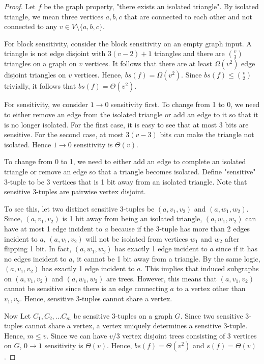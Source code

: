 \documentclass[psamsfonts]{amsart}
\theoremstyle{definition}
\theoremstyle{remark}
\numberwithin{equation}{section}
\begin{document}
\begin{proof}
Let $f$ be the graph property, "there exists an isolated triangle". By isolated triangle, we mean three vertices $a,b,c$ that are connected to each other and not connected to any $v \in V\setminus\{a,b,c\}$.

For block sensitivity, consider the block sensitivity on an empty graph input. A triangle is not edge disjoint with $3(v-2)+1$ triangles and there are ${v \choose 3}$ triangles on a graph on $v$ vertices. It follows that there are at least $\Omega(v^2)$ edge disjoint triangles on $v$ vertices. Hence, $bs(f) = \Omega(v^2)$. Since $bs(f) \leq {v \choose 2}$ trivially, it follows that $bs(f) = \Theta(v^2)$.

For sensitivity, we consider $1 \rightarrow 0$ sensitivity first. To change from 1 to 0, we need to either remove an edge from the isolated triangle or add an edge to it so that it is no longer isolated. For the first case, it is easy to see that at most 3 bits are sensitive. For the second case, at most $3(v-3)$ bits can make the triangle not isolated. Hence $1 \rightarrow 0$ sensitivity is $\Theta(v)$.

To change from 0 to 1, we need to either add an edge to complete an isolated triangle or remove an edge so that a triangle becomes isolated. Define "sensitive" 3-tuple to be 3 vertices that is 1 bit away from an isolated triangle. Note that sensitive 3-tuples are pairwise vertex disjoint. 

To see this, let two distinct sensitive 3-tuples be $(a,v_1,v_2)$ and $(a,w_1,w_2)$. Since, $(a,v_1,v_2)$ is 1 bit away from being an isolated triangle, $(a,w_1,w_2)$ can have at most 1 edge incident to $a$ because if the 3-tuple has more than 2 edges incident to $a$, $(a,v_1,v_2)$ will not be isolated from vertices $w_1$ and $w_2$ after flipping 1 bit. In fact, $(a,w_1,w_2)$ has exactly 1 edge incident to $a$ since if it has no edges incident to $a$, it cannot be 1 bit away from a triangle. By the same logic, $(a,v_1,v_2)$ has exactly 1 edge incident to $a$. This implies that induced subgraphs on $(a,v_1,v_2)$ and $(a,w_1,w_2)$ are trees. However, this means that $(a,v_1,v_2)$ cannot be sensitive since there is an edge connecting $a$ to a vertex other than $v_1,v_2$. Hence, sensitive 3-tuples cannot share a vertex. 

Now Let $C_1, C_2, ... C_m$ be sensitive 3-tuples on a graph $G$. Since two sensitive 3-tuples cannot share a vertex, a vertex uniquely determines a sensitive 3-tuple. Hence, $m \leq v$. Since we can have $v/3$ vertex disjoint trees consisting of 3 vertices on $G$, $0 \rightarrow 1$ sensitivity is $\Theta(v)$.  
Hence, $bs(f) = \Theta(v^2)$ and $s(f) = \Theta(v)$.
\end{proof}
\end{document}
